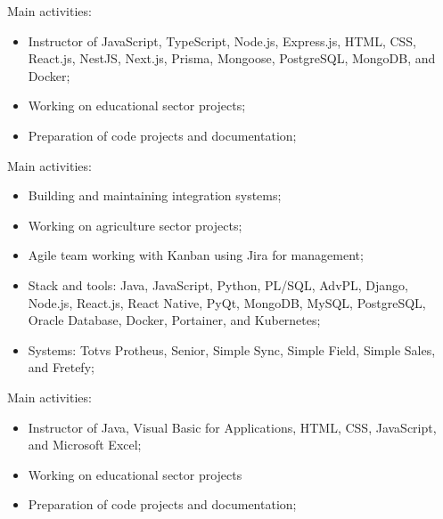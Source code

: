 \documentclass[10pt,a4paper,ragged2e,withhyper]{assets/class/altacv}
\begin{document}
\begin{paracol}{2}
  \divider

  Main activities:
  \begin{itemize}
    \item Instructor of JavaScript, TypeScript, Node.js, Express.js, HTML, CSS, React.js, NestJS, Next.js, Prisma, Mongoose, PostgreSQL, MongoDB, and Docker;
    \item Working on educational sector projects;
    \item Preparation of code projects and documentation;
  \end{itemize}


  Main activities:
  \begin{itemize}
    \item Building and maintaining integration systems;
    \item Working on agriculture sector projects;
    \item Agile team working with Kanban using Jira for management;
    \item Stack and tools: Java, JavaScript, Python, PL/SQL, AdvPL, Django, Node.js, React.js, React Native, PyQt, MongoDB, MySQL, PostgreSQL, Oracle Database, Docker, Portainer, and Kubernetes;
    \item Systems: Totvs Protheus, Senior, Simple Sync, Simple Field, Simple Sales, and Fretefy;
  \end{itemize}

  Main activities:
  \begin{itemize}
    \item Instructor of Java, Visual Basic for Applications, HTML, CSS, JavaScript, and Microsoft Excel;
    \item Working on educational sector projects
    \item Preparation of code projects and documentation;
  \end{itemize}

  \divider


\end{paracol}
\end{document}
